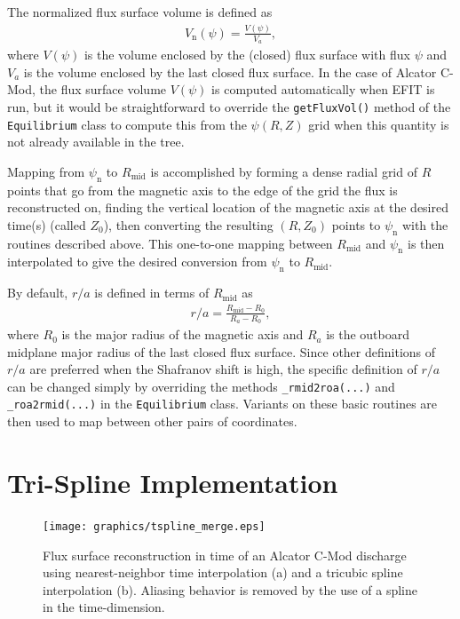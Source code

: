 \documentclass{elsarticle}
\begin{document}
The normalized flux surface volume is defined as
\begin{gather}
	V_{\text{n}}(\psi) = \frac{V(\psi)}{V_{a}},
\end{gather}
where $V(\psi)$ is the volume enclosed by the (closed) flux surface with flux $\psi$ and $V_{a}$ is the volume enclosed by the last closed flux surface.
In the case of Alcator C-Mod, the flux surface volume $V(\psi)$ is computed automatically when EFIT is run, but it would be straightforward to override the \verb|getFluxVol()| method of the \verb|Equilibrium| class to compute this from the $\psi(R, Z)$ grid when this quantity is not already available in the tree.

Mapping from $\psi_{\text{n}}$ to $R_{\text{mid}}$ is accomplished by forming a dense radial grid of $R$ points that go from the magnetic axis to the edge of the grid the flux is reconstructed on, finding the vertical location of the magnetic axis at the desired time(s) (called $Z_{0}$), then converting the resulting $(R, Z_{0})$ points to $\psi_{\text{n}}$ with the routines described above.
This one-to-one mapping between $R_{\text{mid}}$ and $\psi_{\text{n}}$ is then interpolated to give the desired conversion from $\psi_{\text{n}}$ to $R_{\text{mid}}$.

By default, $r/a$ is defined in terms of $R_{\text{mid}}$ as
\begin{gather}
	r/a = \frac{R_{\text{mid}} - R_{0}}{R_{a} - R_{0}},
\end{gather}
where $R_{0}$ is the major radius of the magnetic axis and $R_{a}$ is the outboard midplane major radius of the last closed flux surface.
Since other definitions of $r/a$ are preferred when the Shafranov shift is high, the specific definition of $r/a$ can be changed simply by overriding the methods \verb|_rmid2roa(...)| and \verb|_roa2rmid(...)| in the \verb|Equilibrium| class.
Variants on these basic routines are then used to map between other pairs of coordinates.

\section{Tri-Spline Implementation}\label{sec:trispline}

\begin{figure}[ht]
 \texttt{[image: graphics/tspline\_merge.eps]}
 \caption{Flux surface reconstruction in time of an Alcator C-Mod discharge using nearest-neighbor time interpolation (a) and a tricubic spline interpolation (b). Aliasing behavior is removed by the use of a spline in the time-dimension. }
 \label{fig:tspline}
\end{figure}
\end{document}
